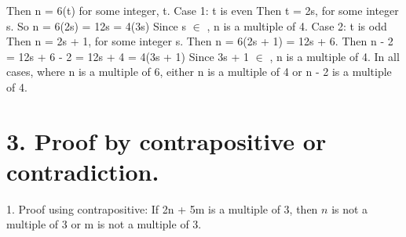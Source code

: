 \documentclass{article}
\begin{document}
Then n = 6(t) for some integer, t.
\newline
Case 1: t is even
\newline
Then t = 2s, for some integer s.
\newline
So n = 6(2s) = 12s = 4(3s)
\newline
Since s \(\in\) , n is a multiple of 4.
\newline
Case 2: t is odd
\newline
Then n = 2s + 1, for some integer s.
\newline
Then n = 6(2s + 1) = 12s + 6.
\newline
Then n - 2 = 12s + 6 - 2 = 12s + 4 = 4(3s + 1)
\newline
Since 3s + 1 \(\in\) , n is a multiple of 4.
\newline
In all cases, where n is a multiple of 6,
either n is a multiple of 4 or n - 2 is a multiple of 4.
\section*{3. Proof by contrapositive or contradiction.}
1. Proof using contrapositive: If 2n + 5m is a multiple of 3, then \(n\) is not a multiple of 3 or m is not a multiple of 3.
\end{document}
